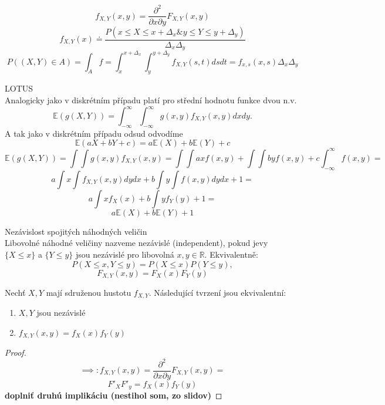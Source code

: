 \documentclass[../main.tex]{subfiles}
\begin{document}
\begin{remark}
    \[f_{X,Y}(x,y) = \frac{\partial^2}{\partial x \partial y} F_{X,Y}(x,y)\]
    \[f_{X,Y}(x) \doteq \frac{P(x\leq X \leq x + \Delta_x \& y\leq Y \leq y + \Delta_y)}{\Delta_x \Delta_y}\]
    \[P((X,Y)\in A) = \int_A f = \int^{x+\Delta_x}_x \int^{y+\Delta_y}_y f_{X,Y}(s,t)dsdt = f_{x,s}(x,s)\Delta_x \Delta_y\]
\end{remark}

\begin{definition}
    LOTUS\\

    Analogicky jako v diskrétním případu platí pro střední hodnotu funkce dvou n.v.
    \[\mathbb{E}(g(X,Y)) = \int^\infty_{-\infty} \int^\infty_{-\infty} g(x,y)f_{X,Y}(x,y)dxdy.\]
    A tak jako v diskrétním případu odsud odvodíme
    \[\mathbb{E}(aX+bY+c) = a\mathbb{E}(X) + b\mathbb{E}(Y) + c\]
    \[\mathbb{E}(g(X,Y)) = \int \int g(x,y)f_{X,Y}(x,y) = \int \int ax f(x,y) + \int \int by f(x,y) + c \int^\infty_{-\infty}f(x,y)=\]
    \[a \int x \int f_{X,Y}(x,y)dydx + b \int y \int f(x,y)dydx + 1 =\]
    \[a \int xf_X(x) + b \int yf_Y(y) + 1 = \]
    \[ a\mathbb{E}(X) + b\mathbb{E}(Y) + 1\]
\end{definition}

\begin{definition}
    Nezávislost spojitých náhodných veličin\\

    Libovolné náhodné veličiny nazveme nezávislé (independent), pokud jevy $\{X\leq x\}$ a $\{Y\leq y\}$ jsou nezávislé pro libovolná $x,y \in \mathbb{R}$. Ekvivalentně:
    \[P(X\leq x, Y\leq y) = P(X\leq x)P(Y\leq y),\]
    \[F_{X,Y}(x,y) = F_X(x)F_Y(y)\]
\end{definition}
\begin{theorem}
    Nechť $X,Y$ mají sdruženou hustotu $f_{X,Y}$. Následující tvrzení jsou ekvivalentní:
    \begin{enumerate}
        \item $X,Y$ jsou nezávislé
        \item $f_{X,Y}(x,y) = f_X(x) f_Y(y)$
    \end{enumerate}
\end{theorem}
\begin{proof}
    \[\implies : f_{X,Y}(x,y) = \frac{\partial^2}{\partial x \partial y} F_{X,Y}(x,y) = \]
    \[F'_X F'_y = f_X(x)f_Y(y)\]
    \textbf{doplniť druhú implikáciu (nestihol som, zo slidov)}
\end{proof}
\end{document}
